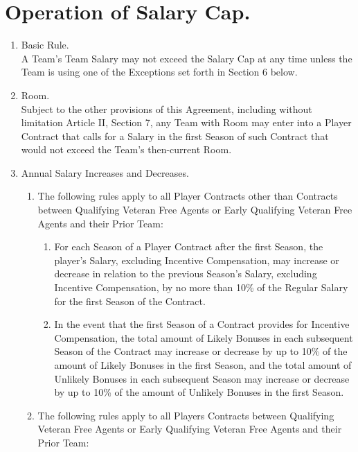 \documentclass[
]{book}
\providecommand{\tightlist}{%
  \setlength{\itemsep}{0pt}\setlength{\parskip}{0pt}}
\begin{document}
\hypertarget{operation-of-salary-cap.}{%
\section{Operation of Salary Cap.}\label{operation-of-salary-cap.}}

\begin{enumerate}
\def\labelenumi{(\alph{enumi})}
\tightlist
\item
  Basic Rule.\\
  A Team's Team Salary may not exceed the Salary Cap at any time unless the Team is using one of the Exceptions set forth in Section 6 below.
\item
  Room.\\
  Subject to the other provisions of this Agreement, including without limitation Article II, Section 7, any Team with Room may enter into a Player Contract that calls for a Salary in the first Season of such Contract that would not exceed the Team's then-current Room.
\item
  Annual Salary Increases and Decreases.

  \begin{enumerate}
  \def\labelenumii{(\arabic{enumii})}
  \tightlist
  \item
    The following rules apply to all Player Contracts other than Contracts between Qualifying Veteran Free Agents or Early Qualifying Veteran Free Agents and their Prior Team:

    \begin{enumerate}
    \def\labelenumiii{(\roman{enumiii})}
    \tightlist
    \item
      For each Season of a Player Contract after the first Season, the player's Salary, excluding Incentive Compensation, may increase or decrease in relation to the previous Season's Salary, excluding Incentive Compensation, by no more than 10\% of the Regular Salary for the first Season of the Contract.
    \item
      In the event that the first Season of a Contract provides for Incentive Compensation, the total amount of Likely Bonuses in each subsequent Season of the Contract may increase or decrease by up to 10\% of the amount of Likely Bonuses in the first Season, and the total amount of Unlikely Bonuses in each subsequent Season may increase or decrease by up to 10\% of the amount of Unlikely Bonuses in the first Season.
    \end{enumerate}
  \item
    The following rules apply to all Players Contracts between Qualifying Veteran Free Agents or Early Qualifying Veteran Free Agents and their Prior Team:


\end{enumerate}
\end{enumerate}
\end{document}
